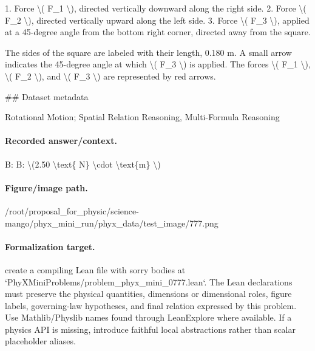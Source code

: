 1. Force \textbackslash{}( F\_1 \textbackslash{}), directed vertically downward along the right side.
2. Force \textbackslash{}( F\_2 \textbackslash{}), directed vertically upward along the left side.
3. Force \textbackslash{}( F\_3 \textbackslash{}), applied at a 45-degree angle from the bottom right corner, directed away from the square.

The sides of the square are labeled with their length, 0.180 m. A small arrow indicates the 45-degree angle at which \textbackslash{}( F\_3 \textbackslash{}) is applied. The forces \textbackslash{}( F\_1 \textbackslash{}), \textbackslash{}( F\_2 \textbackslash{}), and \textbackslash{}( F\_3 \textbackslash{}) are represented by red arrows.

\#\# Dataset metadata

Rotational Motion; Spatial Relation Reasoning, Multi-Formula Reasoning

\paragraph{Recorded answer/context.}
B: B: \textbackslash{}(2.50 \textbackslash{}text\{ N\} \textbackslash{}cdot \textbackslash{}text\{m\} \textbackslash{})

\paragraph{Figure/image path.}
/root/proposal\_for\_physic/science-mango/phyx\_mini\_run/phyx\_data/test\_image/777.png

\paragraph{Formalization target.}
create a compiling Lean file with sorry bodies at `PhyXMiniProblems/problem\_phyx\_mini\_0777.lean`. The Lean declarations must preserve the physical quantities, dimensions or dimensional roles, figure labels, governing-law hypotheses, and final relation expressed by this problem.
Use Mathlib/Physlib names found through LeanExplore where available. If a physics API is missing, introduce faithful local abstractions rather than scalar placeholder aliases.

